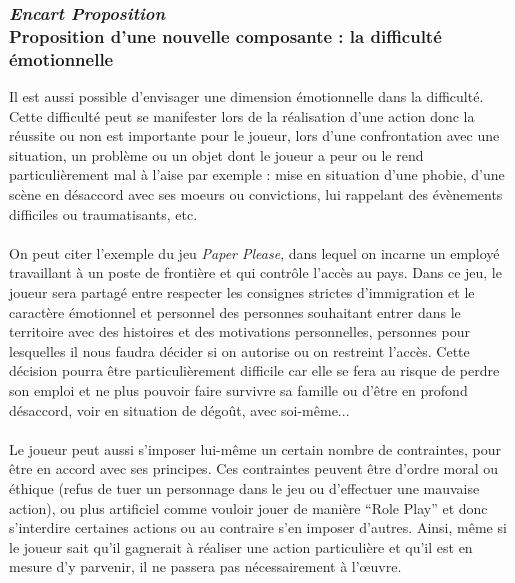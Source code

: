 		\subsubsection{\emph{Encart Proposition}\\ Proposition d'une nouvelle composante : la difficulté émotionnelle}
Il est aussi possible d’envisager une dimension émotionnelle dans la difficulté. Cette difficulté peut se manifester lors de la réalisation d’une action donc la réussite ou non est importante pour le joueur, lors d’une confrontation avec une situation, un problème ou un objet dont le joueur a peur ou le rend particulièrement mal à l’aise par exemple : mise en situation d’une phobie, d’une scène en désaccord avec ses moeurs ou convictions, lui rappelant des évènements difficiles ou traumatisants, etc. \paragraph{}
On peut citer l’exemple du jeu \emph{Paper Please}, dans lequel on incarne un employé travaillant à un poste de frontière et qui contrôle l’accès au pays. Dans ce jeu, le joueur sera partagé entre respecter les consignes strictes d’immigration et le caractère émotionnel et personnel des personnes souhaitant entrer dans le territoire avec des histoires et des motivations personnelles, personnes pour lesquelles il nous faudra décider si on autorise ou on restreint l’accès. Cette décision pourra être particulièrement difficile car elle se fera au risque de perdre son emploi et ne plus pouvoir faire survivre sa famille ou d’être en profond désaccord, voir en situation de dégoût, avec soi-même...\paragraph{}
Le joueur peut aussi s’imposer lui-même un certain nombre de contraintes, pour être en accord avec ses principes. Ces contraintes peuvent être d’ordre moral ou éthique (refus de tuer un personnage dans le jeu ou d’effectuer une mauvaise action), ou plus artificiel comme vouloir jouer de manière “Role Play” et donc s’interdire certaines actions ou au contraire s’en imposer d’autres. Ainsi, même si le joueur sait qu’il gagnerait à réaliser une action particulière et qu’il est en mesure d’y parvenir, il ne passera pas nécessairement à l’œuvre. 
